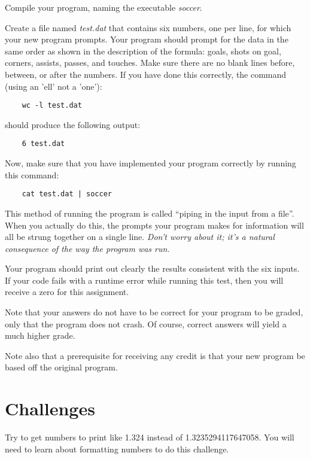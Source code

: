 \documentclass[12pt]{article}
\begin{document}
Compile your program, naming the executable {\it soccer}.

Create a file named {\it test.dat} that contains six numbers,
one per line,
for which your new program prompts.
Your program should prompt for the data in the same order as shown
in the description of the formula: goals, shots on goal,
corners, assists, passes, and touches.
Make sure there are no blank lines before, between, or after
the numbers.
If you have done this correctly, the command
(using an 'ell' not a 'one'):

\begin{verbatim}
    wc -l test.dat
\end{verbatim}
    
should produce the following output:

\begin{verbatim}
    6 test.dat
\end{verbatim}

Now, make sure that you have implemented your
program correctly by running this command:
    
\begin{verbatim}
    cat test.dat | soccer
\end{verbatim}

This method of running the program is called ``piping in the input from
a file''.
When you actually do this, the prompts your program makes for information
will all be strung together on a single line.
{\it Don't worry about it; it's a natural consequence of the way the
program was run.}

Your program should print out clearly the results
consistent with the six inputs.
\color{red}
If your code fails with a runtime error while running this test,
then you will receive a zero for this assignment.
\color{black}

Note that your answers do not have to be correct for your program to be graded,
only that the program does not crash. Of course, correct answers will yield 
a much higher grade.

Note also that a prerequisite for receiving any credit
is that your new program be based off the original program.

\section*{Challenges}

Try to get numbers to print like 1.324 instead of 1.3235294117647058.
You will need to learn about formatting numbers to do this challenge.
\end{document}
